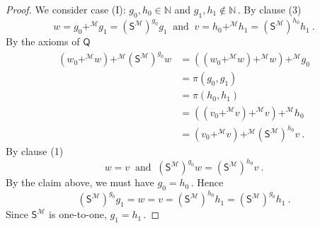 \documentclass[10pt,a4paper, openany,  oldfontcommands]{memoir}
\newtheorem{open problem} [theorem] {Open Problem}
\newtheorem{open question} [theorem] {Open Question}
\renewcommand{\mathrm}{\mathsf}
\begin{document}
\begin{proof}
We consider case (I):  $  g_0, h_0  \in   \mathbb{N} $  and    $  g_1, h_1  \not\in   \mathbb{N}      \,   $. 
By clause (3)  
\[
  w   =  g_0 +^{  \mathcal{M} }   g_1 =   \left(  \mathrm{S}^{   \mathcal{M} }  \right)^{ g_0 }  g_1  
\   \mbox{  and  }    \   
v  =       h_0 +^{  \mathcal{M} }   h_1   =    \left(  \mathrm{S}^{   \mathcal{M} }  \right)^{ h_0 }  h_1  
\        .
\]
By the axioms of  $  \mathsf{Q} $ 
\begin{align*}
 \left( w_0   +^{  \mathcal{M} }  w   \right)     +^{  \mathcal{M} }     \left(    \mathrm{S}^{  \mathcal{M} }  \right)^{ g_0 }   w   
 & =  \left( \left( w_0   +^{  \mathcal{M} }  w   \right)     +^{  \mathcal{M} }   w   \right) +^{  \mathcal{M} }  g_0
 \\
 & =  \pi  ( g_0, g_1)  
\\
& =  \pi  (h_0, h_1) 
\\
&=
\left( \left( v_0   +^{  \mathcal{M} }  v   \right)     +^{  \mathcal{M} }   v   \right) +^{  \mathcal{M} } h_0  
\\
&= 
 \left( v_0   +^{  \mathcal{M} }  v   \right)     +^{  \mathcal{M} }     \left(    \mathrm{S}^{  \mathcal{M} }  \right)^{ h_0 }   v   
\      .
\end{align*}
By clause (1) 
\[
w  =  v     \    \mbox{  and  }     \     \left(    \mathrm{S}^{  \mathcal{M} }  \right)^{ g_0 }   w     =     \left(    \mathrm{S}^{  \mathcal{M} }  \right)^{ h_0 }   v   
\         .
\]
By the claim above, we must have  $  g_0  =  h_0     \,  $. 
Hence 
\[
 \left(  \mathrm{S}^{   \mathcal{M} }  \right)^{ g_0 }  g_1    =   w  =  v  =    \left(  \mathrm{S}^{   \mathcal{M} }  \right)^{ h_0 }  h_1    
 =   \left(  \mathrm{S}^{   \mathcal{M} }  \right)^{ g_0 }  h_1
 \       .  
\]
Since    $  \mathrm{S}^{   \mathcal{M} }   $  is one-to-one,  $  g_1  =  h_1   \,     $. 










\end{proof}
\end{document}
